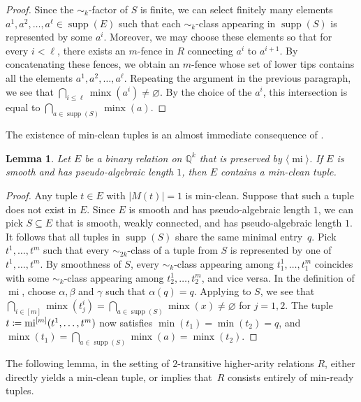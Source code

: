\documentclass[a4paper,reqno, cleveref]{amsart}
\newcommand{\coloneqq}{\mathrel{\mathop:}\mathrel{\mkern-1.2mu}=}
\newtheorem{lemma}[theorem]{Lemma}
\newcommand{\Q}{\mathbb{Q}}
\newcommand{\br}[1]{[#1]}
\DeclareMathOperator{\supp}{supp}
\DeclareMathOperator{\mi}{mi}
\DeclareMathOperator{\minx}{minx}
\newcommand{\bin}{E}
\newcommand{\nested}[2]{{#1^{[#2]}}}
\newcommand{\gen}[1]{\langle#1\rangle}
\begin{document}
\begin{proof}
Since the $\sim_k$-factor of $S$ is finite, we can select finitely many elements $a^1, a^2, \dots, a^{\ell} \in \supp(\bin)$ such that each $\sim_k$-class appearing in $\supp(S)$ is represented by some $a^i$. Moreover, we may choose these elements so that for every $i < \ell$, there exists an $m$-fence in $R$ connecting $a^i$ to $a^{i+1}$.
    By concatenating these fences, we obtain an $m$-fence whose set of lower tips contains all the elements $a^1, a^2, \dots, a^{\ell}$.
    Repeating the argument in the previous paragraph, we see that $\bigcap_{i\leq \ell}\minx(a^i)\neq\varnothing$. 
    By the choice of the $a^i$, this intersection is equal to $\bigcap_{a\in \supp(S)}\minx(a)$.
\end{proof}

The existence of min-clean tuples is an almost immediate consequence of .
\begin{lemma}\label{lemma:mi:minclean}
     Let $\bin$ be a binary relation on $\Q^k$ that is preserved by $\gen{\mi}$.  
     If $\bin$ is smooth and has pseudo-algebraic length $1$, 
     then $\bin$ contains a min-clean tuple.
\end{lemma}
\begin{proof}
Any tuple $t\in \bin$ with $|M(t)|=1$ is min-clean. Suppose that such a tuple does not exist in $\bin$. Since $E$ is smooth and has pseudo-algebraic length $1$, we can pick $S\subseteq E$ that is smooth, weakly connected, and has pseudo-algebraic length $1$. %
    It follows that all tuples in $\supp(S)$ share the same minimal entry~$q$.
    Pick $t^1, \dots, t^m$ such that every $\sim_{2k}$-class of a tuple from $S $ is represented by one of $t^1, \dots, t^m$. By smoothness of $S$, every $\sim_k$-class appearing among $t^1_1, \dots, t^m_1$ coincides with some $\sim_k$-class appearing among $t^1_2, \dots, t^m_2$, and vice versa.
    In the definition of $\mi$, choose  $\alpha,\beta$ and $\gamma$ such that $\alpha(q)=q$.
    Applying  to $S$, we see that  
    $\bigcap_{i\in\br m}\minx(t^i_j)=\bigcap_{a\in \supp(S)}\minx(x)\neq \varnothing$ for $j=1,2.$ 
    The tuple $t\coloneqq\nested{\mi}{m}(t^1,\dots,t^m)$ 
   now  satisfies $\min(t_1)=\min(t_2)=q$, and $\minx(t_1)=\bigcap_{a\in \supp(S)}\minx(a)=\minx(t_2)$.
\end{proof}

The following lemma, in the setting of $2$-transitive higher-arity relations $R$, either directly yields a min-clean tuple, or implies that~$R$ consists entirely of min-ready tuples. 
\end{document}
